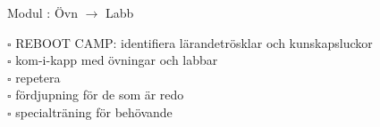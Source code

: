 
Modul : Övn  $\rightarrow$ Labb 
\begin{multicols}{3}\SlideFontTiny
$\square$ REBOOT CAMP: identifiera lärandetrösklar och kunskapsluckor \\
$\square$ kom-i-kapp med övningar och labbar \\
$\square$ repetera \\
$\square$ fördjupning för de som är redo \\
$\square$ specialträning för behövande \\     
\end{multicols}
